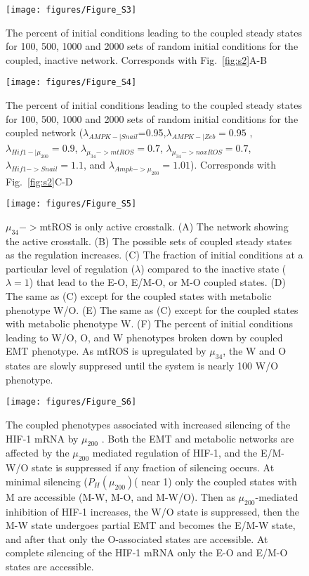 \documentclass{article}
\begin{document}
\begin{figure}
\texttt{[image: figures/Figure\_S3]}
\caption{The percent of initial conditions leading to the coupled steady states for 100, 500, 1000 and 2000 sets of random initial conditions for the coupled, inactive network. Corresponds with Fig.~\ref{fig:s2}A-B}
\end{figure}

\begin{figure}
\texttt{[image: figures/Figure\_S4]}
\caption{The percent of initial conditions leading to the coupled steady states for 100, 500, 1000 and 2000 sets of random initial conditions for the coupled network ($\lambda_{AMPK-|Snail}$=0.95,$\lambda_{AMPK-|Zeb}=0.95$ , $\lambda_{Hif1-|\mu_{200}}=0.9$, $\lambda_{\mu_{34}->mtROS}=0.7$, $\lambda_{\mu_{34}->noxROS}=0.7$, $\lambda_{Hif1->Snail}=1.1$, and $\lambda_{Ampk->\mu_{200}} = 1.01$). Corresponds with Fig.~\ref{fig:s2}C-D }
\end{figure}

\begin{figure}
\texttt{[image: figures/Figure\_S5]}
\caption{$\mu_{34}-> $mtROS is only active crosstalk. (A) The network showing the active crosstalk. (B) The possible sets of coupled steady states as the regulation increases. (C) The fraction of initial conditions at a particular level of regulation ($\lambda$) compared to the inactive state ($\lambda=1$) that lead to the E-O, E/M-O, or M-O coupled states. (D) The same as (C) except for the coupled states with metabolic phenotype W/O. (E) The same as (C) except for the coupled states with metabolic phenotype W. (F) The percent of initial conditions leading to W/O, O, and W phenotypes broken down by coupled EMT phenotype. As mtROS is upregulated by $\mu_{34}$, the W and O states are slowly suppresed until the system is nearly 100 W/O phenotype. }
\end{figure}


\begin{figure}
\texttt{[image: figures/Figure\_S6]}
\caption{The coupled phenotypes associated with increased silencing of the HIF-1 mRNA by $\mu_{200}$ . Both the EMT and metabolic networks are affected by the $\mu_{200}$ mediated regulation of HIF-1, and the E/M-W/O state is suppressed if any fraction of silencing occurs. At minimal silencing ($P_H(\mu_{200})$( near 1) only the coupled states with M are accessible (M-W, M-O, and M-W/O). Then as $\mu_{200}$-mediated inhibition of HIF-1 increases, the W/O state is suppressed, then the M-W state undergoes partial EMT and becomes the E/M-W state, and after that only the O-associated states are accessible. At complete silencing of the HIF-1 mRNA only the E-O and E/M-O states are accessible. }
\end{figure}
\end{document}
